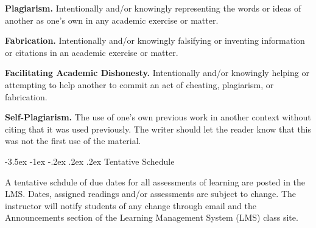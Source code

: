 \documentclass{article}
\makeatletter
\renewcommand\section{\@startsection{section}{1}{0pt}%
  {-3.5ex \@plus -1ex \@minus -.2ex}%
  {.2ex \@plus.2ex}%
  {\normalfont\Large\bfseries}} %
\makeatother
\begin{document}
\textbf{Plagiarism.} Intentionally and/or knowingly representing the words or ideas of another as one's own in any academic exercise or matter.

\textbf{Fabrication.} Intentionally and/or knowingly falsifying or inventing information or citations in an academic exercise or matter.

\textbf{Facilitating Academic Dishonesty.} Intentionally and/or knowingly helping or attempting to help another to commit an act of cheating, plagiarism, or fabrication.

\textbf{Self-Plagiarism.} The use of one's own previous work in another context without citing that it was used previously. The writer should let the reader know that this was not the first use of the material.

\section{Tentative Schedule}

A tentative schdule of due dates for all assessments of learning are posted in the LMS. Dates, assigned readings and/or assessments are subject to change. The instructor will notify students of any change through email and the Announcements section of the Learning Management System (LMS) class site.
\end{document}
